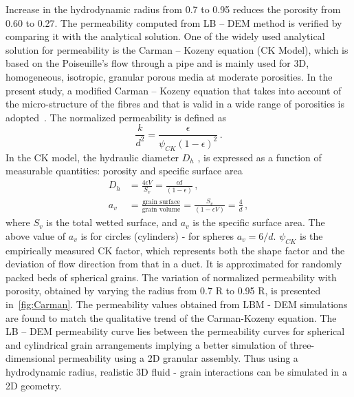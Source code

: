 Increase in the hydrodynamic radius from 0.7 to 0.95 reduces the porosity from 
0.60 to 0.27. The permeability computed from LB – DEM method is verified by 
comparing it with the analytical solution. One of the widely used analytical 
solution for permeability is the Carman – Kozeny equation (CK Model), 
which is based on the Poiseuille's flow through a pipe and is mainly used for 
3D, homogeneous, isotropic, granular porous media at moderate porosities. In 
the present study, a modified Carman – Kozeny equation that takes into account 
of the micro-structure of the fibres and that is valid in a wide range of 
porosities is adopted~\citep{Yazdchi2011}. The normalized permeability is 
defined as
\begin{equation}
\frac{k}{d^2} = \frac{\epsilon}{\psi_{CK}(1-\epsilon)^2} \,.
\end{equation}
%
In the CK model, the hydraulic diameter $D_h$ , is expressed as a function of 
measurable quantities: porosity and specific surface area
%
\begin{align}
D_h & = \frac{4\epsilon V}{S_v}=\frac{\epsilon d}{(1 - \epsilon)} \,, \\
a_v & = \frac{\mbox{grain surface}}{\mbox{grain volume}} = 
\frac{S_v}{(1-\epsilon V)} = \frac{4}{d} \,,
\end{align}
%
where $S_v$ is the total wetted surface, and $a_v$ is the specific surface 
area. The above value of $a_v$ is for circles (cylinders) - for spheres $a_v = 
6/d$. $\psi_{CK}$ is the empirically  measured CK factor, which represents both 
the shape factor and the deviation of flow direction from that in a duct. It is 
approximated for randomly packed beds of spherical grains. The variation of 
normalized permeability with porosity, obtained by varying the radius from 0.7 R
to 0.95 R, is presented in~\cref{fig:Carman}. The permeability values obtained 
from LBM - DEM simulations are found to match the qualitative trend of the 
Carman-Kozeny equation. The LB – DEM permeability curve lies between the 
permeability curves for spherical and cylindrical grain arrangements implying a 
better simulation of three-dimensional permeability using a 2D granular 
assembly. Thus using a hydrodynamic radius, realistic 3D fluid - grain 
interactions can be simulated in a 2D geometry.

